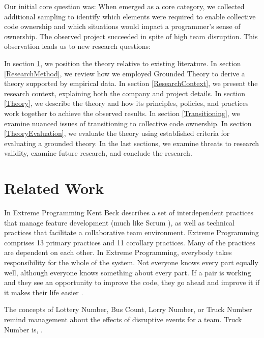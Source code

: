 Our initial core question was:  When  emerged as a core category, we collected additional sampling to identify which elements were required to enable collective code ownership and which situations would impact a programmer's sense of ownership. The observed project succeeded in spite of high team disruption. This observation leads us to new research questions: 

In section \ref{RelatedWork}, we position the theory relative to existing literature. In section \ref{ResearchMethod}, we review how we employed Grounded Theory to derive a theory supported by empirical data. In section \ref{ResearchContext}, we present the research context, explaining both the company and project details. In section \ref{Theory}, we describe the theory and how its principles, policies, and practices work together to achieve the observed results. In section \ref{Transitioning}, we examine nuanced issues of transitioning to collective code ownership. In section \ref{TheoryEvaluation}, we evaluate the theory using established criteria for evaluating a grounded theory. In the last sections, we examine threats to research validity, examine future research, and conclude the research.


\section{Related Work}
\label{RelatedWork}
In Extreme Programming \cite{ExtremeProgramming2004} Kent Beck describes a set of interdependent practices that manage feature development (much like Scrum \cite{Scrum}), as well as technical practices that facilitate a collaborative team environment.  Extreme Programming comprises 13 primary practices and 11 corollary practices. Many of the practices are dependent on each other.  {In Extreme Programming, everybody takes responsibility for the whole of the system. Not everyone knows every part equally well, although everyone knows something about every part. If a pair is working and they see an opportunity to improve the code, they go ahead and improve it if it makes their life easier}  \cite{ExtremeProgramming2000}.



The concepts of Lottery Number, Bus Count, Lorry Number, or Truck Number remind management about the effects of disruptive events for a team. Truck Number is,  \cite{WikiTruckNumber}. 

